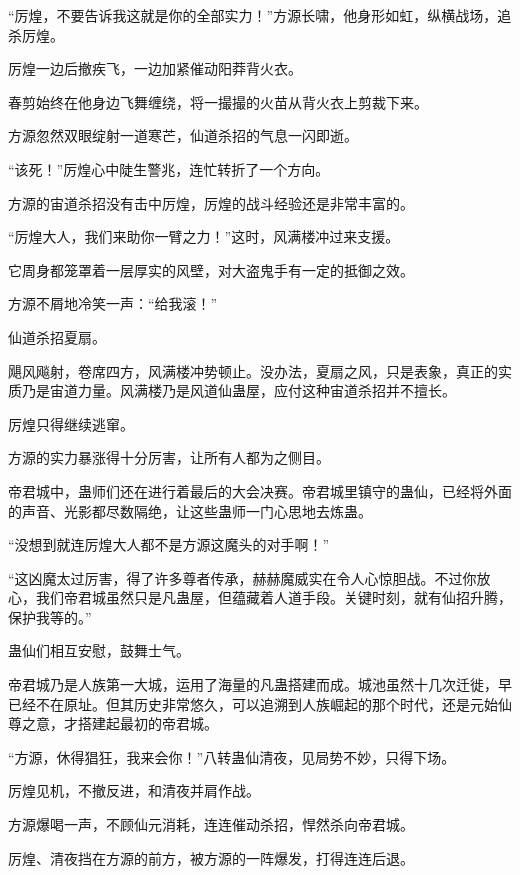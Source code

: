 
\begin{this_body}



“厉煌，不要告诉我这就是你的全部实力！”方源长啸，他身形如虹，纵横战场，追杀厉煌。

厉煌一边后撤疾飞，一边加紧催动阳莽背火衣。

春剪始终在他身边飞舞缠绕，将一撮撮的火苗从背火衣上剪裁下来。

方源忽然双眼绽射一道寒芒，仙道杀招的气息一闪即逝。

“该死！”厉煌心中陡生警兆，连忙转折了一个方向。

方源的宙道杀招没有击中厉煌，厉煌的战斗经验还是非常丰富的。

“厉煌大人，我们来助你一臂之力！”这时，风满楼冲过来支援。

它周身都笼罩着一层厚实的风壁，对大盗鬼手有一定的抵御之效。

方源不屑地冷笑一声：“给我滚！”

仙道杀招夏扇。

飓风飚射，卷席四方，风满楼冲势顿止。没办法，夏扇之风，只是表象，真正的实质乃是宙道力量。风满楼乃是风道仙蛊屋，应付这种宙道杀招并不擅长。

厉煌只得继续逃窜。

方源的实力暴涨得十分厉害，让所有人都为之侧目。

帝君城中，蛊师们还在进行着最后的大会决赛。帝君城里镇守的蛊仙，已经将外面的声音、光影都尽数隔绝，让这些蛊师一门心思地去炼蛊。

“没想到就连厉煌大人都不是方源这魔头的对手啊！”

“这凶魔太过厉害，得了许多尊者传承，赫赫魔威实在令人心惊胆战。不过你放心，我们帝君城虽然只是凡蛊屋，但蕴藏着人道手段。关键时刻，就有仙招升腾，保护我等的。”

蛊仙们相互安慰，鼓舞士气。

帝君城乃是人族第一大城，运用了海量的凡蛊搭建而成。城池虽然十几次迁徙，早已经不在原址。但其历史非常悠久，可以追溯到人族崛起的那个时代，还是元始仙尊之意，才搭建起最初的帝君城。

“方源，休得猖狂，我来会你！”八转蛊仙清夜，见局势不妙，只得下场。

厉煌见机，不撤反进，和清夜并肩作战。

方源爆喝一声，不顾仙元消耗，连连催动杀招，悍然杀向帝君城。

厉煌、清夜挡在方源的前方，被方源的一阵爆发，打得连连后退。


\end{this_body}
